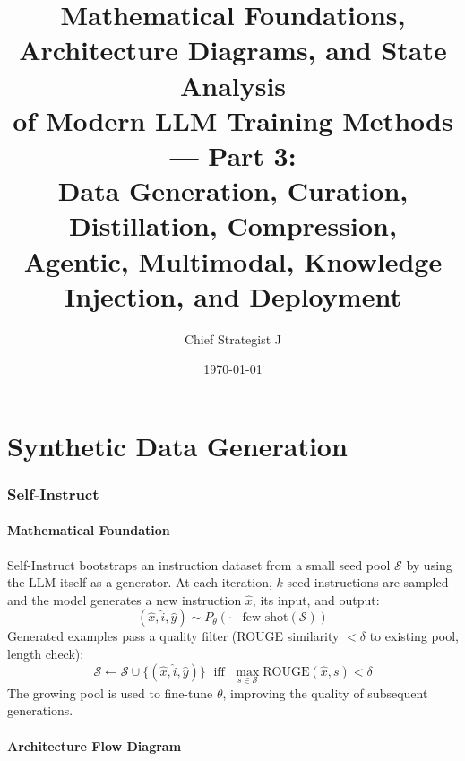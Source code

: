 
\title{\textbf{Mathematical Foundations, Architecture Diagrams, and State Analysis\\
of Modern LLM Training Methods --- Part 3:\\
Data Generation, Curation, Distillation, Compression,\\
Agentic, Multimodal, Knowledge Injection, and Deployment}}
\author{Chief Strategist J}
\date{\today}
\maketitle
\tableofcontents
\newpage

\part{Synthetic Data Generation}

\section{Self-Instruct}

\subsection{Mathematical Foundation}
Self-Instruct bootstraps an instruction dataset from a small seed pool $\mathcal{S}$ by using the LLM itself as a generator. At each iteration, $k$ seed instructions are sampled and the model generates a new instruction $\hat{x}$, its input, and output:
\begin{equation}
  (\hat{x}, \hat{i}, \hat{y}) \sim P_\theta(\cdot \mid \text{few-shot}(\mathcal{S}))
\end{equation}
Generated examples pass a quality filter (ROUGE similarity $< \delta$ to existing pool, length check):
\begin{equation}
  \mathcal{S} \leftarrow \mathcal{S} \cup \{(\hat{x},\hat{i},\hat{y})\} \;\text{ iff }\; \max_{s\in\mathcal{S}} \text{ROUGE}(\hat{x}, s) < \delta
\end{equation}
The growing pool is used to fine-tune $\theta$, improving the quality of subsequent generations.

\subsection{Architecture Flow Diagram}

